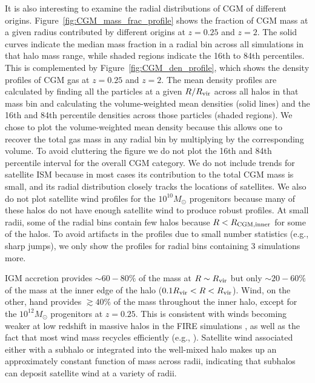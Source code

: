\documentclass[fleqn,usenatbib]{mnras}
\begin{document}
It is also interesting to examine the radial distributions of CGM of different origins. 
Figure~\ref{fig:CGM_mass_frac_profile} shows the fraction of CGM mass at a given radius contributed by different origins at $z=0.25$ and $z=2$.
The solid curves indicate the median mass fraction in a radial bin across all simulations in that halo mass range, while shaded regions indicate the 16th to 84th percentiles.
This is complemented by Figure~\ref{fig:CGM_den_profile}, which shows the density profiles of CGM gas at $z=0.25$ and $z=2$.
The mean density profiles are calculated by finding all the particles at a given $R/R_{\rm vir}$ across all halos in that mass bin and calculating the volume-weighted mean densities (solid lines) and the 16th and 84th percentile densities across those particles (shaded regions). 
We chose to plot the volume-weighted mean density because this allows one to recover the total gas mass in any radial bin by multiplying by the corresponding volume. 
To avoid cluttering the figure we do not plot the 16th and 84th percentile interval for the overall CGM category. 
We do not include trends for satellite ISM because in most cases its contribution to the total CGM mass is small, and its radial distribution closely tracks the locations of satellites. 
We also do not plot satellite wind profiles for the $10^{10} M_\odot$ progenitors because many of these halos do not have enough satellite wind to produce robust profiles. 
At small radii, some of the radial bins contain few halos because $R<R_{\rm CGM, inner}$ for some of the halos. 
To avoid artifacts in the profiles due to small number statistics (e.g., sharp jumps), we only show the profiles for radial bins containing 3 simulations more.

IGM accretion provides $\sim 60-80\%$ of the mass at $R\sim R_{\rm vir}$ but only $\sim 20-60\%$ of the mass at the inner edge of the halo ($0.1R_{\rm vir}<R<R_{\rm vir}$). 
Wind, on the other, hand provides $\gtrsim 40\%$ of the mass throughout the inner halo, except for the $10^{12} M_\odot$ progenitors at $z=0.25$. 
This is consistent with winds becoming weaker at low redshift in massive halos in the FIRE simulations \cite[e.g.,][]{Muratov2015}, as well as the fact that most wind mass recycles efficiently (e.g., \citealt{Angles-Alcazar2017}). 
Satellite wind associated either with a subhalo or integrated into the well-mixed halo makes up an approximately constant function of mass across radii, indicating that subhalos can deposit satellite wind at a variety of radii.
\end{document}
